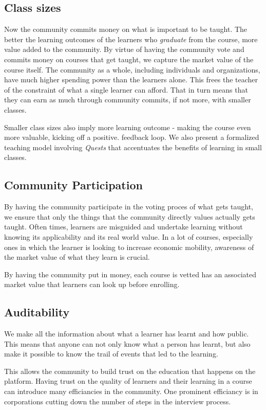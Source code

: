 \documentclass{article}
\begin{document}
    \subsection{Class sizes}
      Now the community commits money on what is important to be taught. The better the learning outcomes of the learners who \textit{graduate} from the course, more value added to the community. By virtue of having the community vote and commits money on courses that get taught, we capture the market value of the course itself. The community as a whole, including individuals and organizations, have much higher spending power than the learners alone. This frees the teacher of the constraint of what a single learner can afford. That in turn means that they can earn as much through community commits, if not more, with smaller classes.
      \par
      Smaller class sizes also imply more learning outcome \cite{classsize} - making the course even more valuable, kicking off a positive. feedback loop. We also present a formalized teaching model involving \textit{Quests} that accentuates the benefits of learning in small classes.
    \subsection{Community Participation}
      By having the community participate in the voting proces of what gets taught, we ensure that only the things that the community directly values actually gets taught. Often times, learners are misguided and undertake learning without knowing its applicability and its real world value. In a lot of courses, especially ones in which the learner is looking to increase economic mobility, awareness of the market value of what they learn is crucial.
      \par
      By having the community put in money, each course is vetted has an associated market value that learners can look up before enrolling. 
    \subsection{Auditability}
      We make all the information about what a learner has learnt and how public. This means that anyone can not only know what a person has learnt, but also make it possible to know the trail of events that led to the learning. 
      \par
      This allows the community to build trust on the education that happens on the platform.
      Having trust on the quality of learners and their learning in a course can introduce many efficiancies in the community. One prominent efficiancy is in corporations cutting down the number of steps in the interview process. \cite{lesserroundsfortopcolleges}
\end{document}
